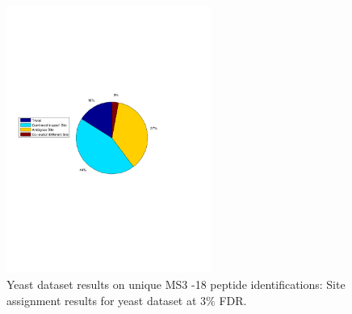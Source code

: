 \begin{figure}[htbp]
\centering %
\includegraphics[trim = 0mm 90mm 20mm 90mm,clip,width=0.6\textwidth]{fig/phospho/uniqueIds/piechart_uniq_by_STY.pdf}
\caption{Yeast dataset results on unique MS3 -18 peptide identifications: Site assignment results for yeast dataset at $3\%$ FDR.}
\label{fig:yeast_piechart_uniqIds_STY}
\end{figure}

\clearpage
